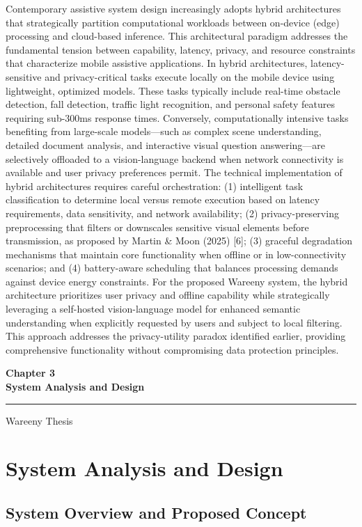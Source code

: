 \documentclass[12pt,a4paper]{report}
\newcommand{\chaptercover}[1]{%
  \clearpage
  \thispagestyle{empty}
  \vspace*{\fill}
  \begin{center}
    {\Huge\bfseries #1\par}
    \vspace{0.8cm}
    \rule{0.35\textwidth}{1pt}\par
    \vspace{0.6cm}
    {\Large Wareeny Thesis\par}
  \end{center}
  \vspace*{\fill}
  \clearpage
}
\begin{document}
Contemporary assistive system design increasingly adopts hybrid architectures that strategically partition computational workloads between on-device (edge) processing and cloud-based inference. This architectural paradigm addresses the fundamental tension between capability, latency, privacy, and resource constraints that characterize mobile assistive applications. In hybrid architectures, latency-sensitive and privacy-critical tasks execute locally on the mobile device using lightweight, optimized models. These tasks typically include real-time obstacle detection, fall detection, traffic light recognition, and personal safety features requiring sub-300ms response times. Conversely, computationally intensive tasks benefiting from large-scale models---such as complex scene understanding, detailed document analysis, and interactive visual question answering---are selectively offloaded to a vision-language backend when network connectivity is available and user privacy preferences permit. The technical implementation of hybrid architectures requires careful orchestration: (1) intelligent task classification to determine local versus remote execution based on latency requirements, data sensitivity, and network availability; (2) privacy-preserving preprocessing that filters or downscales sensitive visual elements before transmission, as proposed by Martin \& Moon (2025) [6]; (3) graceful degradation mechanisms that maintain core functionality when offline or in low-connectivity scenarios; and (4) battery-aware scheduling that balances processing demands against device energy constraints. For the proposed Wareeny system, the hybrid architecture prioritizes user privacy and offline capability while strategically leveraging a self-hosted vision-language model for enhanced semantic understanding when explicitly requested by users and subject to local filtering. This approach addresses the privacy-utility paradox identified earlier, providing comprehensive functionality without compromising data protection principles.


\chaptercover{Chapter 3\\System Analysis and Design}
\chapter{System Analysis and Design}

\section{System Overview and Proposed Concept}
\end{document}
